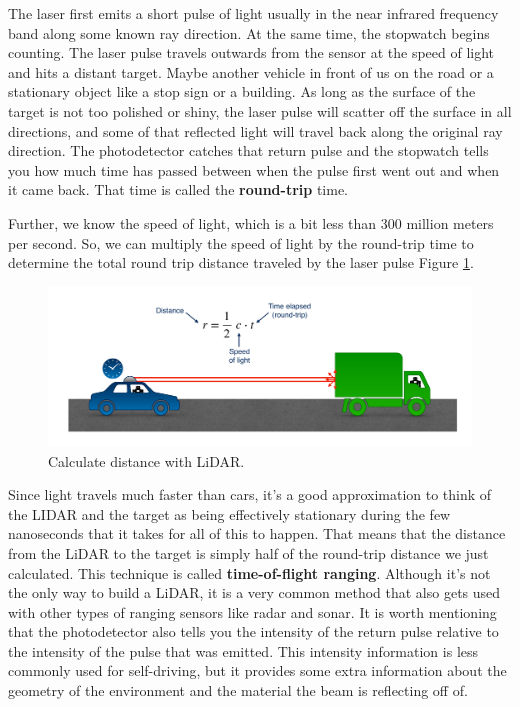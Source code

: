 The laser first emits a short pulse of light usually in the near infrared frequency band
along some known ray direction. At the same time,
the stopwatch begins counting. The laser pulse travels
outwards from the sensor at the speed of light and
hits a distant target. Maybe another vehicle in
front of us on the road or a stationary object like
a stop sign or a building. As long as the surface of the target
is not too polished or shiny, the laser pulse will scatter off
the surface in all directions, and some of that reflected light will travel back along
the original ray direction. The photodetector catches that return
pulse and the stopwatch tells you how much time has passed between when the pulse first went out
and when it came back. That time is called the \textbf{round-trip} time. 

Further, we know the speed of light, which is a bit less than 300
million meters per second. So, we can multiply the speed of
light by the round-trip time to determine the total round trip distance
traveled by the laser pulse Figure \ref{lidar_3}. 

\begin{figure}[!htb]
\begin{center}
\includegraphics[scale=0.280]{img/hardware/lidar_3.jpeg}
\end{center}
\caption{Calculate distance with LiDAR.}
\label{lidar_3}
\end{figure}

Since light travels much faster than cars, it's a good approximation to think
of the LIDAR and the target as being effectively stationary
during the few nanoseconds that it takes for all of this to happen. That means that the distance from
the LiDAR to the target is simply half of the round-trip distance
we just calculated. This technique is called
\textbf{time-of-flight ranging}. Although it's not the only way
to build a LiDAR, it is a very common method
that also gets used with other types of ranging sensors like radar and sonar. 
It is worth mentioning that the photodetector also
tells you the intensity of the return pulse relative to the
intensity of the pulse that was emitted. This intensity information is less
commonly used for self-driving, but it provides some extra information
about the geometry of the environment and the material
the beam is reflecting off of. 

